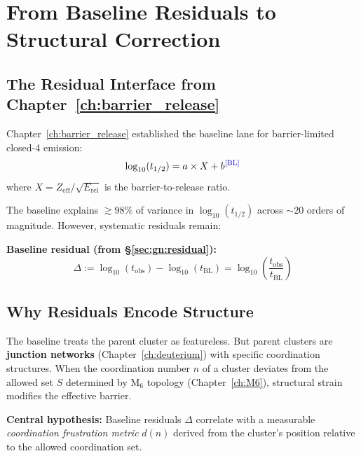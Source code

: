 \section{From Baseline Residuals to Structural Correction}
\label{sec:frustrated:motivation}

\subsection{The Residual Interface from Chapter~\ref{ch:barrier_release}}

Chapter~\ref{ch:barrier_release} established the baseline lane for barrier-limited
closed-4 emission:
\begin{equation}
    \log_{10}(t_{1/2}) = a \times X + b \tagBL
    \label{eq:f:baseline_recall}
\end{equation}
where $X = Z_{\text{eff}}/\sqrt{E_{\text{rel}}}$ is the barrier-to-release ratio.

The baseline explains $\gtrsim 98\%$ of variance in $\log_{10}(t_{1/2})$ across
$\sim 20$ orders of magnitude. However, systematic residuals remain:

\begin{derivationbox}
    \textbf{Baseline residual (from \S\ref{sec:gn:residual}):}
    \begin{equation}
        \Delta := \log_{10}(t_{\text{obs}}) - \log_{10}(t_{\text{BL}})
        = \log_{10}\!\left(\frac{t_{\text{obs}}}{t_{\text{BL}}}\right)
        \label{eq:f:residual_def}
    \end{equation}
    \tagBL
\end{derivationbox}

\subsection{Why Residuals Encode Structure}

The baseline treats the parent cluster as featureless. But parent clusters
are \textbf{junction networks} (Chapter~\ref{ch:deuterium}) with specific
coordination structures. When the coordination number $n$ of a cluster
deviates from the allowed set $S$ determined by M$_6$ topology
(Chapter~\ref{ch:M6}), structural strain modifies the effective barrier.

\begin{resultbox}
    \textbf{Central hypothesis:}
    Baseline residuals $\Delta$ correlate with a measurable \emph{coordination
    frustration metric} $d(n)$ derived from the cluster's position relative to
    the allowed coordination set.
    \tagP
\end{resultbox}

